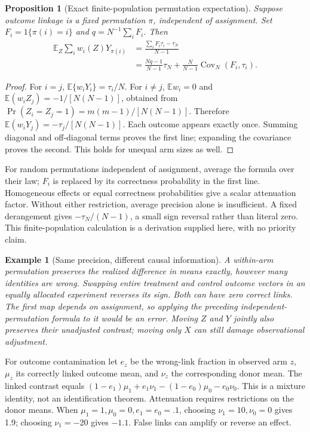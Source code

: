 \documentclass[11pt]{article}
\newtheorem{proposition}{Proposition}
\newtheorem{example}{Example}
\newcommand{\E}{\mathbb E}
\newcommand{\Cov}{\operatorname{Cov}}
\begin{document}
\begin{proposition}[Exact finite-population permutation expectation]
Suppose outcome linkage is a fixed permutation $\pi$, independent of assignment.
Set $F_i=1\{\pi(i)=i\}$ and $q=N^{-1}\sum_iF_i$. Then
\begin{align*}
 \E_Z\sum_i w_i(Z)Y_{\pi(i)}
 &=\frac{\sum_i F_i\tau_i-\tau_N}{N-1}\\
 &=\frac{Nq-1}{N-1}\tau_N+
   \frac{N}{N-1}\Cov_N(F_i,\tau_i).
\end{align*}
\end{proposition}
\begin{proof}
For $i=j$, $\E\{w_iY_i\}=\tau_i/N$. For $i\ne j$,
$\E w_i=0$ and $\E(w_iZ_j)=-1/[N(N-1)]$, obtained from
$\Pr(Z_i=Z_j=1)=m(m-1)/[N(N-1)]$. Therefore
$\E(w_iY_j)=-\tau_j/[N(N-1)]$. Each outcome appears exactly once.
Summing diagonal and off-diagonal terms proves the first line; expanding the covariance
proves the second. This holds for unequal arm sizes as well.
\end{proof}
For random permutations independent of assignment, average the formula over their law;
$F_i$ is replaced by its correctness probability in the first line. Homogeneous effects
or equal correctness probabilities give a scalar attenuation factor. Without either
restriction, average precision alone is insufficient. A fixed derangement gives
$-\tau_N/(N-1)$, a small sign reversal rather than literal zero. This finite-population
calculation is a derivation supplied here, with no priority claim.

\begin{example}[Same precision, different causal information]
A within-arm permutation preserves the realized difference in means exactly, however
many identities are wrong. Swapping entire treatment and control outcome vectors in
an equally allocated experiment reverses its sign. Both can have zero correct links.
The first map depends on assignment, so applying the preceding independent-permutation
formula to it would be an error. Moving $Z$ and $Y$ jointly also preserves their
unadjusted contrast; moving only $X$ can still damage observational adjustment.
\end{example}

For outcome contamination let $e_z$ be the wrong-link fraction in observed arm $z$,
$\mu_z$ its correctly linked outcome mean, and $\nu_z$ the corresponding donor mean.
The linked contrast equals
$(1-e_1)\mu_1+e_1\nu_1-(1-e_0)\mu_0-e_0\nu_0$.
This is a mixture identity, not an identification theorem. Attenuation requires
restrictions on the donor means. When $\mu_1=1,\mu_0=0,e_1=e_0=.1$, choosing
$\nu_1=10,\nu_0=0$ gives 1.9; choosing $\nu_1=-20$ gives $-1.1$.
False links can amplify or reverse an effect.
\end{document}
